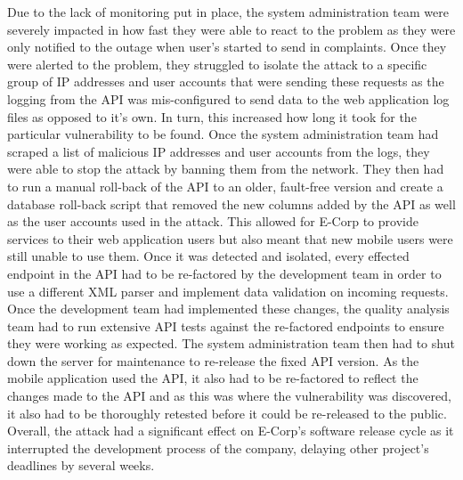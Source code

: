 \documentclass[]{report}
\begin{document}
Due to the lack of monitoring put in place, the system administration team were severely impacted in how fast they were able to react to the problem as they were only notified to the outage when user's started to send in complaints. Once they were alerted to the problem, they struggled to isolate the attack to a specific group of IP addresses and user accounts that were sending these requests as the logging from the API was mis-configured to send data to the web application log files as opposed to it's own. In turn, this increased how long it took for the particular vulnerability to be found. Once the system administration team had scraped a list of malicious IP addresses and user accounts from the logs, they were able to stop the attack by banning them from the network. They then had to run a manual roll-back of the API to an older, fault-free version and create a database roll-back script that removed the new columns added by the API as well as the user accounts used in the attack. This allowed for E-Corp to provide services to their web application users but also meant that new mobile users were still unable to use them. Once it was detected and isolated, every effected endpoint in the API had to be re-factored by the development team in order to use a different XML parser and implement data validation on incoming requests. Once the development team had implemented these changes, the quality analysis team had to run extensive API tests against the re-factored endpoints to ensure they were working as expected. The system administration team then had to shut down the server for maintenance to re-release the fixed API version. As the mobile application used the API, it also had to be re-factored to reflect the changes made to the API and as this was where the vulnerability was discovered, it also had to be thoroughly retested before it could be re-released to the public. Overall, the attack had a significant effect on E-Corp's software release cycle as it interrupted the development process of the company, delaying other project's deadlines by several weeks. 
\end{document}
